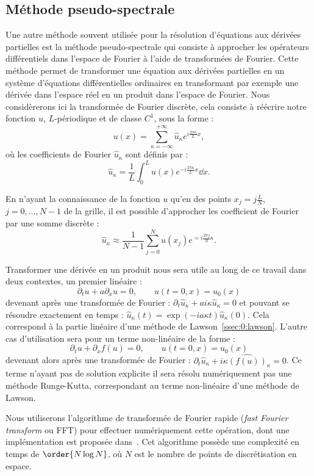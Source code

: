 \subsection{Méthode pseudo-spectrale}

Une autre méthode souvent utilisée pour la résolution d'équations aux dérivées partielles est la méthode pseudo-spectrale qui consiste à approcher les opérateurs différentiels dans l'espace de Fourier à l'aide de transformées de Fourier. Cette méthode permet de transformer une équation aux dérivées partielles en un système d'équations différentielles ordinaires en transformant par exemple une dérivée dans l'espace réel en un produit dans l'espace de Fourier. Nous considèrerons ici la transformée de Fourier discrète, cela consiste à réécrire notre fonction $u$, $L$-périodique et de classe $C^1$, sous la forme :
$$
  u(x) = \sum_{\kappa=-\infty}^{+\infty} \hat{u}_\kappa e^{i\frac{2\pi \kappa}{L}x},
$$
où les coefficients de Fourier $\hat{u}_\kappa$ sont définis par :
$$
  \hat{u}_\kappa = \frac{1}{L}\int_0^L u(x)e^{-i\frac{2\pi \kappa}{L}x}\dd{x}.
$$

En n'ayant la connaissance de la fonction $u$ qu'en des points $x_j = j\frac{L}{N}$, $j=0,\dots,N-1$ de la grille, il est possible d'approcher les coefficient de Fourier par une somme discrète :
$$
  \hat{u}_\kappa \approx \frac{1}{N-1}\sum_{j=0}^N u(x_j) e^{=i\frac{2\pi j}{N}\kappa}.
$$

Transformer une dérivée en un produit nous sera utile au long de ce travail dans deux contextes, un premier linéaire :
$$
  \partial_t u + a\partial_x u = 0,\qquad u(t=0,x)=u_0(x)
$$
devenant après une transformée de Fourier : $\partial_t \hat{u}_\kappa + ai\kappa \hat{u}_\kappa = 0$ et pouvant se résoudre exactement en temps : $\hat{u}_\kappa(t) = \exp(-ia\kappa t)\hat{u}_\kappa(0)$. Cela correspond à la partie linéaire d'une méthode de Lawson~\ref{ssec:0:lawson}. L'autre cas d'utilisation sera pour un terme non-linéaire de la forme :
$$
  \partial_t u + \partial_xf(u) = 0,\qquad u(t=0,x)=u_0(x)
$$
devenant alors après une transformée de Fourier : $\partial_t\hat{u}_\kappa + i\kappa\widehat{\left(f(u)\right)}_\kappa = 0$. Ce terme n'ayant pas de solution explicite il sera résolu numériquement pas une méthode Runge-Kutta, correspondant au terme non-linéaire d'une méthode de Lawson.

Nous utiliserons l'algorithme de transformée de Fourier rapide (\emph{fast Fourier transform} ou FFT) pour effectuer numériquement cette opération, dont une implémentation est proposée dans~\cite{Saramito:2013}. Cet algorithme possède une complexité en temps de $\order{N\log N}$, où $N$ est le nombre de points de discrétisation en espace.
